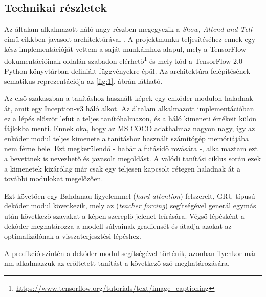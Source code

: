 \begin{multicols}{2}
\section{Technikai részletek} \label{section:3}
Az általam alkalmazott háló nagy részben megegyezik a \textit{Show, Attend and Tell} című cikkben javasolt architektúrával \citep{2015arXiv150203044X}. A projektmunka teljesítéséhez ennek egy kész implementációját vettem a saját munkámhoz alapul, mely a TensorFlow dokumentációinak oldalán szabadon elérhető\footnote{\url{https://www.tensorflow.org/tutorials/text/image_captioning}} és mely kód a TensorFlow 2.0 Python könyvtárban definiált függvényekre épül. Az architektúra felépítésének sematikus reprezentációja az \ref{fig:1}. ábrán látható. \par
Az első szakaszban a tanításhoz használt képek egy enkóder modulon haladnak át, amit egy Inception-v3 háló alkot. Az általam alkalmazott implementációban ez a lépés először lefut a teljes tanítóhalmazon, és a háló kimeneti értékeit külön fájlokba menti. Ennek oka, hogy az MS COCO adathalmaz nagyon nagy, így az enkóder modul teljes kimenete a tanításhoz használt számítógép memóriájába nem férne bele. Ezt megkerülendő - habár a futásidő rovására -, alkalmaztam ezt a bevettnek is nevezhető és javasolt megoldást. A valódi tanítási ciklus során ezek a kimenetek kizárólag már csak egy teljesen kapcsolt rétegen haladnak át a további modulokat megelőzően. \par
Ezt követően egy  Bahdanau-figyelemmel (\emph{hard attention}) felszerelt, GRU típusú dekóder modul következik, mely az  (\emph{teacher forcing}) segítségével generál egymás után következő szavakat a képen szereplő jelenet leírására. Végső lépésként a dekóder meghatározza a modell súlyainak gradiensét és átadja azokat az optimalizálónak a visszaterjesztési lépéshez. \par
A predikció szintén a dekóder modul segítségével történik, azonban ilyenkor már nm alkalmazzuk az erőltetett tanítást a következő szó meghatározására.


\end{multicols}
